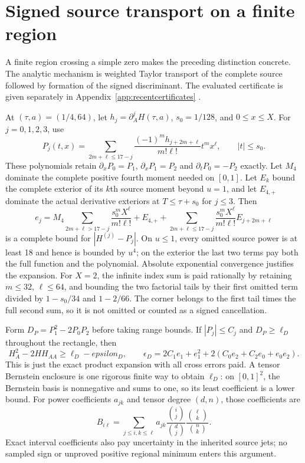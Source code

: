 \documentclass[11pt]{article}
\numberwithin{equation}{section}
\begin{document}
\section{Signed source transport on a finite region}
\label{fcg:signedtransport}

A finite region crossing a simple zero makes the preceding distinction
concrete. The analytic mechanism is weighted Taylor transport of the
complete source followed by formation of the signed discriminant.
The evaluated certificate is given separately in
Appendix~\ref{app:recentcertificates} \cite{FCGSignedTransport}.

At $(\tau,a)=(1/4,64)$, let $h_j=\partial_A^jH(\tau,a)$,
$s_0=1/128$, and $0\le x\le X$. For $j=0,1,2,3$, use
\begin{equation}\label{fcg:weightedtransport}
 P_j(t,x)=\sum_{2m+\ell\le17-j}
       \frac{(-1)^m h_{j+2m+\ell}}{m!\ell!}t^mx^\ell,
 \qquad |t|\le s_0.
\end{equation}
These polynomials retain $\partial_xP_0=P_1$,
$\partial_xP_1=P_2$ and $\partial_tP_0=-P_2$ exactly.
Let $M_4$ dominate the complete positive fourth moment needed on
$[0,1]$. Let $E_k$ bound the complete exterior of its $k$th source
moment beyond $u=1$, and let $E_{4,+}$ dominate the actual derivative
exteriors at $T\le\tau+s_0$ for $j\le3$. Then
\begin{equation}\label{fcg:transporterror}
 e_j=M_4\sum_{2m+\ell>17-j}\frac{s_0^mX^\ell}{m!\ell!}
       +E_{4,+}
       +\sum_{2m+\ell\le17-j}
              \frac{s_0^mX^\ell}{m!\ell!}E_{j+2m+\ell}
\end{equation}
is a complete bound for $|H^{(j)}-P_j|$. On $u\le1$, every omitted
source power is at least 18 and hence is bounded by $u^4$; on the
exterior the last two terms pay both the full function and the
polynomial. Absolute exponential convergence justifies the expansion.
For $X=2$, the infinite index sum is paid rationally by retaining
$m\le32$, $\ell\le64$, and bounding the two factorial tails by their
first omitted term divided by $1-s_0/34$ and $1-2/66$.
The corner belongs to the first tail times the full second sum, so
it is not omitted or counted as a signed cancellation.

Form $D_P=P_1^2-2P_0P_2$ before taking range bounds. If
$|P_j|\le C_j$ and $D_P\ge\ell_D$ throughout the rectangle, then
\begin{equation}\label{fcg:discriminantpayment}
 H_A^2-2HH_{AA}\ge\ell_D-epsilon_D,\qquad
 \epsilon_D=2C_1e_1+e_1^2+2(C_0e_2+C_2e_0+e_0e_2).
\end{equation}
This is just the exact product expansion with all cross errors paid.
A tensor Bernstein enclosure is one rigorous finite way to obtain
$\ell_D$: on $[0,1]^2$, the Bernstein basis is nonnegative and sums
to one, so its least coefficient is a lower bound. For power
coefficients $a_{jk}$ and tensor degree $(d,n)$, those coefficients are
\[
 B_{i\ell}=\sum_{j\le i,k\le\ell}a_{jk}
       \frac{\binom ij}{\binom dj}\frac{\binom\ell k}{\binom nk}.
\]
Exact interval coefficients also pay uncertainty in the inherited
source jets; no sampled sign or unproved positive regional minimum
enters this argument.
\end{document}
